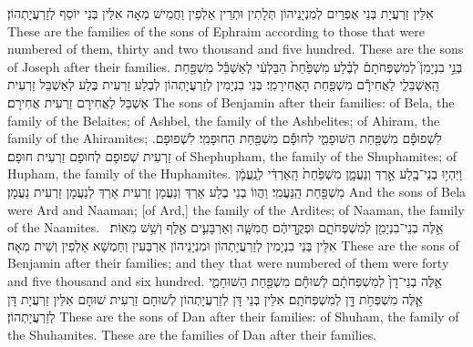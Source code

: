 {אִלֵּין זַרְעֲיָת בְּנֵי אֶפְרַיִם לְמִנְיָנֵיהוֹן תְּלָתִין וּתְרֵין אַלְפִין וַחֲמֵישׁ מְאָה אִלֵּין בְּנֵי יוֹסֵף לְזַרְעֲיָתְהוֹן׃}
{These are the families of the sons of Ephraim according to those that were numbered of them, thirty and two thousand and five hundred. These are the sons of Joseph after their families.}{}
{בְּנֵ֣י בִנְיָמִן֮ לְמִשְׁפְּחֹתָם֒ לְבֶ֗לַע מִשְׁפַּ֙חַת֙ הַבַּלְעִ֔י לְאַשְׁבֵּ֕ל מִשְׁפַּ֖חַת הָֽאַשְׁבֵּלִ֑י לַאֲחִירָ֕ם מִשְׁפַּ֖חַת הָאֲחִירָמִֽי׃
}
{בְּנֵי בִנְיָמִין לְזַרְעֲיָתְהוֹן לְבֶלַע זַרְעִית בֶּלַע לְאַשְׁבֵּל זַרְעִית אַשְׁבֵּל לַאֲחִירָם זַרְעִית אֲחִירָם׃}
{The sons of Benjamin after their families: of Bela, the family of the Belaites; of Ashbel, the family of the Ashbelites; of Ahiram, the family of the Ahiramites;}{}
{לִשְׁפוּפָ֕ם מִשְׁפַּ֖חַת הַשּׁוּפָמִ֑י לְחוּפָ֕ם מִשְׁפַּ֖חַת הַחוּפָמִֽי׃
}
{לִשְׁפוּפָם. זַרְעִית שְׁפוּפָם לְחוּפָם זַרְעִית חוּפָם׃}
{of Shephupham, the family of the Shuphamites; of Hupham, the family of the Huphamites.}{}
{וַיִּהְי֥וּ בְנֵי־בֶ֖לַע אַ֣רְדְּ וְנַעֲמָ֑ן מִשְׁפַּ֙חַת֙ הָֽאַרְדִּ֔י לְנַֽעֲמָ֔ן מִשְׁפַּ֖חַת הַֽנַּעֲמִֽי׃}
{וַהֲווֹ בְנֵי בֶלַע אַרְדְּ וְנַעֲמָן זַרְעִית אַרְדְּ לְנַעֲמָן זַרְעִית נַעֲמָן׃}
{And the sons of Bela were Ard and Naaman; [of Ard,] the family of the Ardites; of Naaman, the family of the Naamites.}{}
{אֵ֥לֶּה בְנֵי־בִנְיָמִ֖ן לְמִשְׁפְּחֹתָ֑ם וּפְקֻ֣דֵיהֶ֔ם חֲמִשָּׁ֧ה וְאַרְבָּעִ֛ים אֶ֖לֶף וְשֵׁ֥שׁ מֵאֽוֹת׃ \setuma }
{אִלֵּין בְּנֵי בִנְיָמִין לְזַרְעֲיָתְהוֹן וּמִנְיָנֵיהוֹן אַרְבְּעִין וְחַמְשָׁא אַלְפִין וְשֵׁית מְאָה׃}
{These are the sons of Benjamin after their families; and they that were numbered of them were forty and five thousand and six hundred.}{}
{אֵ֤לֶּה בְנֵי־דָן֙ לְמִשְׁפְּחֹתָ֔ם לְשׁוּחָ֕ם מִשְׁפַּ֖חַת הַשּׁוּחָמִ֑י אֵ֛לֶּה מִשְׁפְּחֹ֥ת דָּ֖ן לְמִשְׁפְּחֹתָֽם׃
}
{אִלֵּין בְּנֵי דָּן לְזַרְעֲיָתְהוֹן לְשׁוּחָם זַרְעִית שׁוּחָם אִלֵּין זַרְעֲיָת דָּן לְזַרְעֲיָתְהוֹן׃}
{These are the sons of Dan after their families: of Shuham, the family of the Shuhamites. These are the families of Dan after their families.}{}
